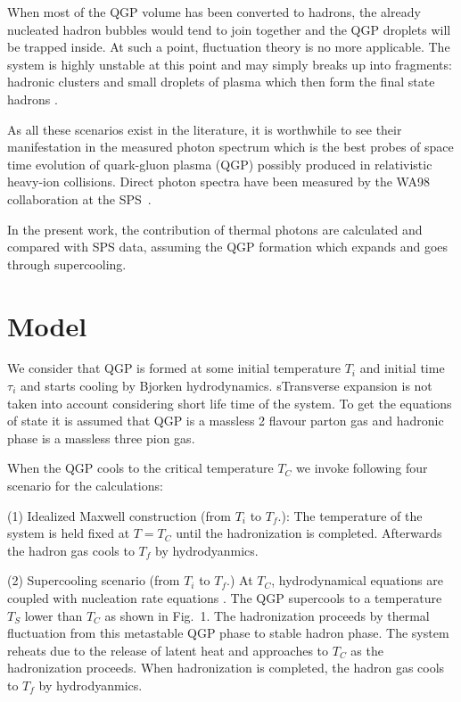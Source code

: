   When most of the QGP volume has been converted to hadrons, 
the already nucleated hadron bubbles would tend to join together and 
the QGP droplets will be trapped inside. At such a point, fluctuation 
theory is no more applicable. The system is highly unstable at this point 
and may simply breaks up into fragments: hadronic clusters and small 
droplets of plasma which then form the final state hadrons \cite{ZABPRC}. 

  As all these scenarios exist in the literature, it is worthwhile 
to see their manifestation in the measured photon spectrum 
which is the best probes of space time evolution of 
quark-gluon plasma (QGP) possibly produced in relativistic heavy-ion
collisions. Direct photon spectra have been measured by
the WA98 collaboration at the SPS~\cite{WA98}.

   In the present work, the contribution of thermal photons  
are calculated and compared with SPS data, assuming the QGP formation which 
expands and goes through supercooling.


\section{Model}

 We consider that QGP is formed at some initial temperature $T_i$ and
initial time $\tau_i$ and starts cooling by Bjorken hydrodynamics.
sTransverse expansion is not taken into account considering short 
life time of the system. To get the equations of state it is assumed that 
QGP is a massless 2 flavour parton gas and hadronic phase is a massless three 
pion gas.

 When the QGP cools to the critical temperature $T_C$ we invoke 
following four scenario for the calculations:

(1) Idealized Maxwell construction (from $T_i$ to $T_f$.):
    The temperature of the system is held fixed at $T=T_C$ until 
    the hadronization is completed. Afterwards the hadron gas
    cools to $T_f$ by hydrodyanmics.

(2) Supercooling scenario (from $T_i$ to $T_f$.)
   At $T_C$, hydrodynamical equations are coupled with nucleation 
  rate equations \cite{IHOMO,SPINO}. The QGP 
   supercools to a temperature $T_S$ lower than 
  $T_C$ as shown in Fig.~1. The hadronization proceeds by 
  thermal fluctuation from this metastable QGP phase to stable hadron phase. 
 The system reheats due to the release of latent heat and approaches to 
 $T_C$ as the hadronization proceeds. When hadronization is completed,  
 the hadron gas cools to $T_f$ by hydrodyanmics.

